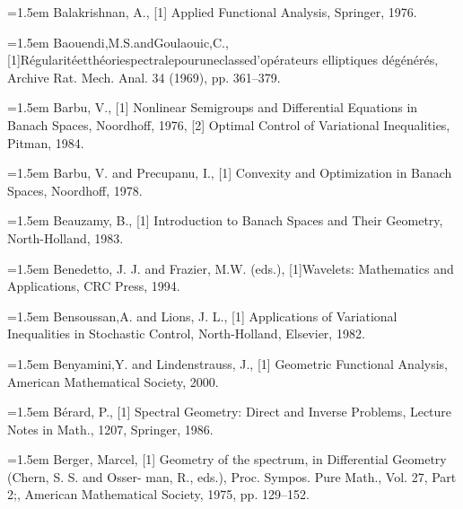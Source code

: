\noindent\hangindent=1.5em Balakrishnan, A., \hypertarget{ref:Balakrishnan-1}{[1]} Applied Functional Analysis, Springer, 1976.\par{}
\noindent\hangindent=1.5em Baouendi,M.S.andGoulaouic,C.,\hypertarget{ref:BaouendiGoulaouic-1}{[1]}Régularitéetthéoriespectralepouruneclassed'opérateurs elliptiques dégénérés, Archive Rat. Mech. Anal. 34 (1969), pp. 361--379.\par{}
\noindent\hangindent=1.5em Barbu, V., \hypertarget{ref:Barbu-1}{[1]} Nonlinear Semigroups and Differential Equations in Banach Spaces, Noordhoff, 1976, \hypertarget{ref:Barbu-2}{[2]} Optimal Control of Variational Inequalities, Pitman, 1984.\par{}
\noindent\hangindent=1.5em Barbu, V. and Precupanu, I., \hypertarget{ref:BarbuPrecupanu-1}{[1]} Convexity and Optimization in Banach Spaces, Noordhoff, 1978.\par{}
\noindent\hangindent=1.5em Beauzamy, B., \hypertarget{ref:Beauzamy-1}{[1]} Introduction to Banach Spaces and Their Geometry, North-Holland, 1983.\par{}
\noindent\hangindent=1.5em Benedetto, J. J. and Frazier, M.W. (eds.), \hypertarget{ref:BenedettoFrazier-1}{[1]}Wavelets: Mathematics and Applications, CRC Press, 1994.\par{}
\noindent\hangindent=1.5em Bensoussan,A. and Lions, J. L., \hypertarget{ref:BensoussanLions-1}{[1]} Applications of Variational Inequalities in Stochastic Control, North-Holland, Elsevier, 1982.\par{}
\noindent\hangindent=1.5em Benyamini,Y. and Lindenstrauss, J., \hypertarget{ref:Benyamini-1}{[1]} Geometric Functional Analysis, American Mathematical Society, 2000.\par{}
\noindent\hangindent=1.5em Bérard, P., \hypertarget{ref:Berard-1}{[1]} Spectral Geometry: Direct and Inverse Problems, Lecture Notes in Math., 1207, Springer, 1986.\par{}
\noindent\hangindent=1.5em Berger, Marcel, \hypertarget{ref:Berger-1}{[1]} Geometry of the spectrum, in Differential Geometry (Chern, S. S. and Osser- man, R., eds.), Proc. Sympos. Pure Math., Vol. 27, Part 2;, American Mathematical Society, 1975, pp. 129--152.\par{}
